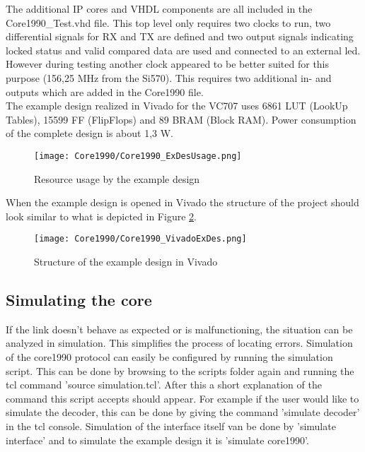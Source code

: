 	\vspace{2mm}
	The additional IP cores and VHDL components are all included in the Core1990\_Test.vhd file. This top level only requires two clocks to run, two differential signals for RX and TX are defined and two output signals indicating locked status and valid compared data are used and connected to an external led. However during testing another clock appeared to be better suited for this purpose (156,25 MHz from the Si570). This requires two additional in- and outputs which are added in the Core1990 file.\\

	The example design realized in Vivado for the VC707 uses 6861 LUT (LookUp Tables), 15599 FF (FlipFlops) and 89 BRAM (Block RAM). Power consumption of the complete design is about 1,3 W.
	\begin{figure}[H]
		\centering
		\texttt{[image: Core1990/Core1990\_ExDesUsage.png]}	
		\caption{Resource usage by the example design}
		\label{fig:Core1990_ExDesUsage}
	\end{figure}

	When the example design is opened in Vivado the structure of the project should look similar to what is depicted in Figure \ref{fig:Core1990_VivadoExDes}.
		
	\begin{figure}[H]
		\centering
		\texttt{[image: Core1990/Core1990\_VivadoExDes.png]}	
		\caption{Structure of the example design in Vivado}
		\label{fig:Core1990_VivadoExDes}
	\end{figure}
	

	\newpage
	
	\subsection{Simulating the core}
	If the link doesn't behave as expected or is malfunctioning, the situation can be analyzed in simulation. This simplifies the process of locating errors.
	Simulation of the core1990 protocol can easily be configured by running the simulation script. This can be done by browsing to the scripts folder again and running the tcl command 'source simulation.tcl'. After this a short explanation of the command this script accepts should appear. For example if the user would like to simulate the decoder, this can be done by giving the command 'simulate decoder' in the tcl console. Simulation of the interface itself van be done by 'simulate interface' and to simulate the example design it is 'simulate core1990'.\\
	
